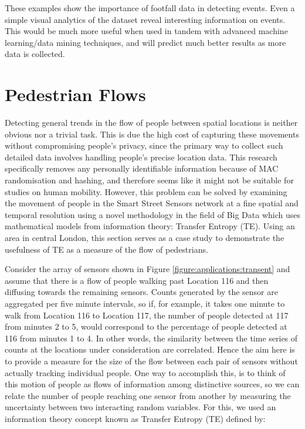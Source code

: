 These examples show the importance of footfall data in detecting events. 
Even a simple visual analytics of the dataset reveal interesting information on events. 
This would be much more useful when used in tandem with advanced machine learning/data mining techniques, and will predict much better results as more data is collected.

\section{Pedestrian Flows}

Detecting general trends in the flow of people between spatial locations is neither obvious nor a trivial task. 
This is due the high cost of capturing these movements without compromising people’s privacy, since the primary way to collect such detailed data involves handling people’s precise location data. 
This research specifically removes any personally identifiable information because of MAC randomisation and hashing, and therefore seems like it might not be suitable for studies on human mobility. 
However, this problem can be solved by examining the movement of people in the Smart Street Sensors network at a fine spatial and temporal resolution using a novel methodology in the field of Big Data which uses mathematical models from information theory: Transfer Entropy (TE). 
Using an area in central London, this section serves as a case study to demonstrate the usefulness of TE as a measure of the flow of pedestrians.

Consider the array of sensors shown in Figure \ref{figure:applications:transent} and assume that there is a flow of people walking past Location 116 and then diffusing towards the remaining sensors. 
Counts generated by the sensor are aggregated per five minute intervals, so if, for example, it takes one minute to walk from Location 116 to Location 117, the number of people detected at 117 from minutes 2 to 5, would correspond to the percentage of people detected at 116 from minutes 1 to 4. 
In other words, the similarity between the time series of counts at the locations under consideration are correlated. 
Hence the aim here is to provide a measure for the size of the flow between each pair of sensors without actually tracking individual people. 
One way to accomplish this, is to think of this motion of people as flows of information among distinctive sources, so we can relate the number of people reaching one sensor from another by measuring the uncertainty between two interacting random variables. 
For this, we used an information theory concept known as Transfer Entropy (TE) defined by:

